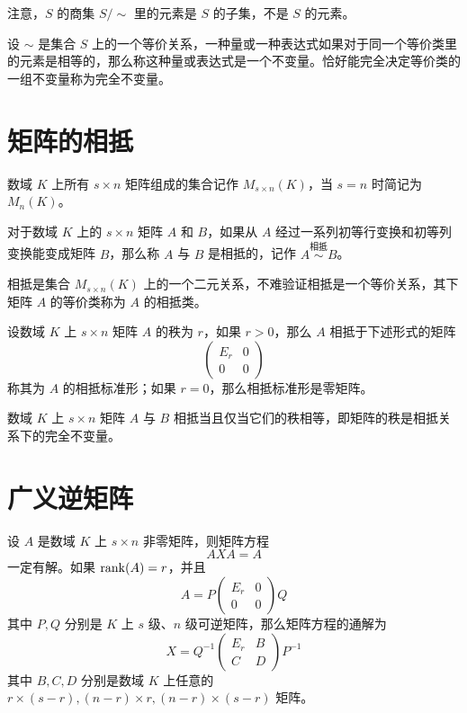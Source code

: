 注意，$S$ 的商集 $S/\sim$ 里的元素是 $S$ 的子集，不是 $S$ 的元素。

设 $\sim$ 是集合 $S$ 上的一个等价关系，一种量或一种表达式如果对于同一个等价类里的元素是相等的，那么称这种量或表达式是一个不变量。恰好能完全决定等价类的一组不变量称为完全不变量。

\section{矩阵的相抵}

数域 $K$ 上所有 $s\times n$ 矩阵组成的集合记作 $M_{s\times n}(K)$，当 $s=n$ 时简记为 $M_n(K)$。

\begin{definition}
	对于数域 $K$ 上的 $s\times n$ 矩阵 $A$ 和 $B$，如果从 $A$ 经过一系列初等行变换和初等列变换能变成矩阵 $B$，那么称 $A$ 与 $B$ 是相抵的，记作 $A\overset{\text{相抵}}{\sim}B$。
\end{definition}

相抵是集合 $M_{s\times n}(K)$ 上的一个二元关系，不难验证相抵是一个等价关系，其下矩阵 $A$ 的等价类称为 $A$ 的相抵类。

\begin{theorem}
	设数域 $K$ 上 $s\times n$ 矩阵 $A$ 的秩为 $r$，如果 $r>0$，那么 $A$ 相抵于下述形式的矩阵
	\[\left(\begin{matrix}
				E_r & 0  \\
				0   & 0
			\end{matrix}\right)\]
	称其为 $A$ 的相抵标准形；如果 $r=0$，那么相抵标准形是零矩阵。
\end{theorem}

\begin{theorem}
	数域 $K$ 上 $s\times n$ 矩阵 $A$ 与 $B$ 相抵当且仅当它们的秩相等，即矩阵的秩是相抵关系下的完全不变量。
\end{theorem}

\section{广义逆矩阵}

\begin{theorem}
	设 $A$ 是数域 $K$ 上 $s\times n$ 非零矩阵，则矩阵方程
	\[AXA = A\]
	一定有解。如果 $\operatorname{rank}(A) = r$，并且
	\[A = P\left(\begin{matrix}
				E_r & 0  \\
				0   & 0
			\end{matrix}\right)Q\]
	其中 $P,Q$ 分别是 $K$ 上 $s$ 级、$n$ 级可逆矩阵，那么矩阵方程的通解为
	\[X = Q^{-1}\left(\begin{matrix}
				E_r & B  \\
				C   & D
			\end{matrix}\right)P^{-1}\]
	其中 $B,C,D$ 分别是数域 $K$ 上任意的 $r\times (s-r),(n-r)\times r,(n-r)\times (s-r)$ 矩阵。
\end{theorem}

